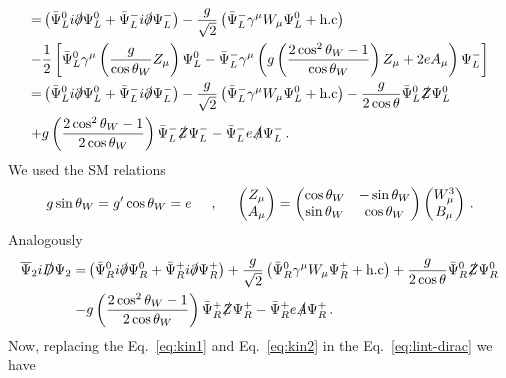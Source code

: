 \begin{align}
=&\left(\bar{\Psi}_L^0i\slashed{\partial}\Psi_L^0+\bar{\Psi}_L^-i\slashed{\partial}\Psi_L^-\right)
-\dfrac{g}{\sqrt{2}}\left(\bar{\Psi}_L^-\gamma^{\mu}W_{\mu}\Psi_L^0
+\text{h.c}\right)\nonumber\\
-&\dfrac{1}{2}\left[\bar{\Psi}_L^0\gamma^{\mu}\left(\dfrac{g}{\cos\theta_W}Z_{\mu}\right)\Psi_L^0-\bar{\Psi}_L^-\gamma^{\mu}\left(g\left(\dfrac{2\cos^2\theta_W-1}{\cos\theta_W}\right)Z_{\mu}+2eA_{\mu}\right)\Psi_L^-\right]
\nonumber\\
=&\left(\bar{\Psi}_L^0i\slashed{\partial}\Psi_L^0+\bar{\Psi}_L^-i\slashed{\partial}\Psi_L^-\right)
-\dfrac{g}{\sqrt{2}}\left(\bar{\Psi}_L^-\gamma^{\mu}W_{\mu}\Psi_L^0
+\text{h.c}\right)
-\dfrac{g}{2\cos\theta}\bar{\Psi}_L^0\slashed{Z}\Psi_L^0 \nonumber\\
+& g\left(\dfrac{2\cos^2\theta_W-1}{2\cos\theta_W}\right)\bar{\Psi}_L^-\slashed{Z}\Psi_L^--\bar{\Psi}_L^-e\slashed{A}\Psi_L^-\,.
\end{align}
We used the SM relations~\cite{Pich:2005mk}
\begin{align}
g\sin\theta_W=g'\cos\theta_W=e \hspace{0.5 cm} , \hspace{0.5 cm} 
\begin{pmatrix}
Z_{\mu} \\ A_{\mu}
\end{pmatrix}=\begin{pmatrix}
\cos\theta_W & -\sin\theta_W \\
\sin\theta_W & \cos\theta_W
\end{pmatrix}\begin{pmatrix}
W^3_{\mu} \\ B_{\mu}
\end{pmatrix}\,.
\end{align}
%
Analogously
%
\begin{align}
\label{eq:kin2}
\overline{\Psi}_2i\slashed{D}\Psi_2
=&\left(\bar{{\Psi}}_R^0i\slashed{\partial}\Psi_R^0+\bar{\Psi}_R^+i\slashed{\partial}\Psi_R^+\right)
+\dfrac{g}{\sqrt{2}}\left(\bar{\Psi}_R^0\gamma^{\mu}W_{\mu}\Psi_R^+
+\text{h.c}\right)
+\dfrac{g}{2\cos\theta}\bar{\Psi}_R^0\slashed{Z}\Psi_R^0 \nonumber\\
-& g\left(\dfrac{2\cos^2\theta_W-1}{2\cos\theta_W}\right)\bar{\Psi}_R^+\slashed{Z}\Psi_R^+-\bar{\Psi}_R^+e\slashed{A}\Psi_R^+\,.
\end{align}
%
Now, replacing the Eq.~\eqref{eq:kin1} and Eq.~\eqref{eq:kin2} in the Eq.~\eqref{eq:lint-dirac} we have
%
